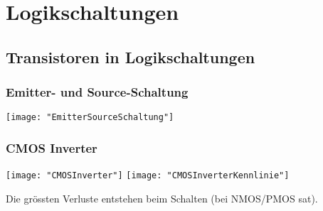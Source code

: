 \section{Logikschaltungen}
\subsection{Transistoren in Logikschaltungen}
\subsubsection{Emitter- und Source-Schaltung}
\begin{minipage}[t]{0.3\textwidth}
	\vspace{0pt}								%
	\texttt{[image: "EmitterSourceSchaltung"]}
\end{minipage}\hspace{0.05\textwidth}
\begin{minipage}[t]{0.65\textwidth}
	\vspace{0pt}								%
	
\end{minipage}
\vspace{2mm}

\subsubsection{CMOS Inverter}
\begin{minipage}[t]{0.3\textwidth}
	\vspace{0pt}								%
	\texttt{[image: "CMOSInverter"]}
	\texttt{[image: "CMOSInverterKennlinie"]}
\end{minipage}\hspace{0.05\textwidth}
\begin{minipage}[t]{0.65\textwidth}
	\vspace{0pt}								%
	Die grössten Verluste entstehen beim Schalten (bei NMOS/PMOS sat).
\end{minipage}
\vspace{2mm}


